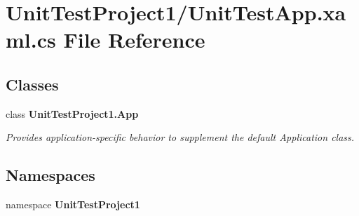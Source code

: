 \section{Unit\+Test\+Project1/\+Unit\+Test\+App.xaml.\+cs File Reference}
\label{UnitTestApp_8xaml_8cs}
\subsection*{Classes}
\begin{DoxyCompactItemize}
\item 
class \textbf{ Unit\+Test\+Project1.\+App}
\begin{DoxyCompactList}\small\item\em Provides application-\/specific behavior to supplement the default Application class. \end{DoxyCompactList}\end{DoxyCompactItemize}
\subsection*{Namespaces}
\begin{DoxyCompactItemize}
\item 
namespace \textbf{ Unit\+Test\+Project1}
\end{DoxyCompactItemize}
